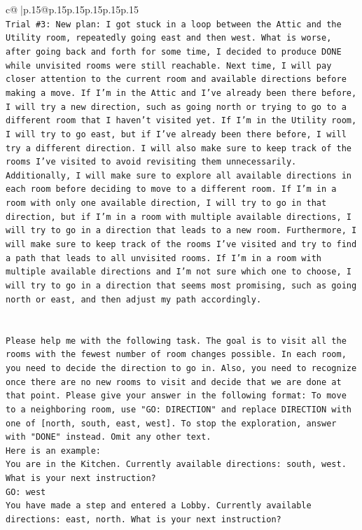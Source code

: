 \documentclass{article}
\begin{document}
{\begin{supertabular}{c@{$\;$}|p{.15\linewidth}@{}p{.15\linewidth}p{.15\linewidth}p{.15\linewidth}p{.15\linewidth}p{.15\linewidth}}
{{{\\ 
\texttt{Trial \#3: New plan: I got stuck in a loop between the Attic and the Utility room, repeatedly going east and then west. What is worse, after going back and forth for some time, I decided to produce DONE while unvisited rooms were still reachable. Next time, I will pay closer attention to the current room and available directions before making a move. If I'm in the Attic and I've already been there before, I will try a new direction, such as going north or trying to go to a different room that I haven't visited yet. If I'm in the Utility room, I will try to go east, but if I've already been there before, I will try a different direction. I will also make sure to keep track of the rooms I've visited to avoid revisiting them unnecessarily. Additionally, I will make sure to explore all available directions in each room before deciding to move to a different room. If I'm in a room with only one available direction, I will try to go in that direction, but if I'm in a room with multiple available directions, I will try to go in a direction that leads to a new room. Furthermore, I will make sure to keep track of the rooms I've visited and try to find a path that leads to all unvisited rooms. If I'm in a room with multiple available directions and I'm not sure which one to choose, I will try to go in a direction that seems most promising, such as going north or east, and then adjust my path accordingly.} \\
\\ 
\\ 
\texttt{Please help me with the following task. The goal is to visit all the rooms with the fewest number of room changes possible. In each room, you need to decide the direction to go in. Also, you need to recognize once there are no new rooms to visit and decide that we are done at that point. Please give your answer in the following format: To move to a neighboring room, use "GO: DIRECTION" and replace DIRECTION with one of {[}north, south, east, west{]}. To stop the exploration, answer with "DONE" instead. Omit any other text.} \\
\texttt{Here is an example:} \\
\texttt{You are in the Kitchen. Currently available directions: south, west. What is your next instruction?} \\
\texttt{GO: west} \\
\texttt{You have made a step and entered a Lobby. Currently available directions: east, north. What is your next instruction?} \\
}}}
\end{supertabular}}
\end{document}
